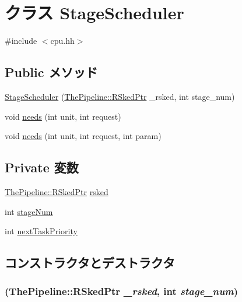 \hypertarget{classInOrderCPU_1_1StageScheduler}{
\section{クラス StageScheduler}
\label{classInOrderCPU_1_1StageScheduler}
}


{\ttfamily \#include $<$cpu.hh$>$}\subsection*{Public メソッド}
\begin{DoxyCompactItemize}
\item 
\hyperlink{classInOrderCPU_1_1StageScheduler_a6b25d078fced4cacd3a28b19fb5359b2}{StageScheduler} (\hyperlink{classResourceSked}{ThePipeline::RSkedPtr} \_\-rsked, int stage\_\-num)
\item 
void \hyperlink{classInOrderCPU_1_1StageScheduler_abe9e2575f4a19fa0d829e7a4ceccddf5}{needs} (int unit, int request)
\item 
void \hyperlink{classInOrderCPU_1_1StageScheduler_a235f6065e34ca0d8b263e944ed3f30d7}{needs} (int unit, int request, int param)
\end{DoxyCompactItemize}
\subsection*{Private 変数}
\begin{DoxyCompactItemize}
\item 
\hyperlink{classResourceSked}{ThePipeline::RSkedPtr} \hyperlink{classInOrderCPU_1_1StageScheduler_ad30f30216e0eb24192038add1f917975}{rsked}
\item 
int \hyperlink{classInOrderCPU_1_1StageScheduler_a9da7aa2f94c428eaed5adad96a6ab151}{stageNum}
\item 
int \hyperlink{classInOrderCPU_1_1StageScheduler_aa5a8d1ca67045a36a1f1417dc12415ae}{nextTaskPriority}
\end{DoxyCompactItemize}


\subsection{コンストラクタとデストラクタ}
\hypertarget{classInOrderCPU_1_1StageScheduler_a6b25d078fced4cacd3a28b19fb5359b2}{
\subsubsection[{StageScheduler}]{ ({\bf ThePipeline::RSkedPtr} {\em \_\-rsked}, \/  int {\em stage\_\-num})}}
\label{classInOrderCPU_1_1StageScheduler_a6b25d078fced4cacd3a28b19fb5359b2}



